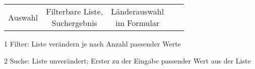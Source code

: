 \begin{table}[!htb]
\begin{adjustbox}{max width=\textwidth}
\begin{threeparttable}
\begin{tabular}{ l || c | c | c | c }
{                                                           Auswahl} & \tbbr{Filterbare Liste, \\ 
                                                                            Suchergebnis} & \tbbr{Länderauswahl \\ 
                                                                                                  im Formular} \\
            \end{tabular}
            \begin{tablenotes}
                \scriptsize
                \item[1] Filter: Liste verändern je nach Anzahl passender Werte
                \item[2] Suche: Liste unverändert; Erster zu der Eingabe passender Wert aus der Liste     
            \end{tablenotes}
        \end{threeparttable}
    \end{adjustbox}
\end{table}
